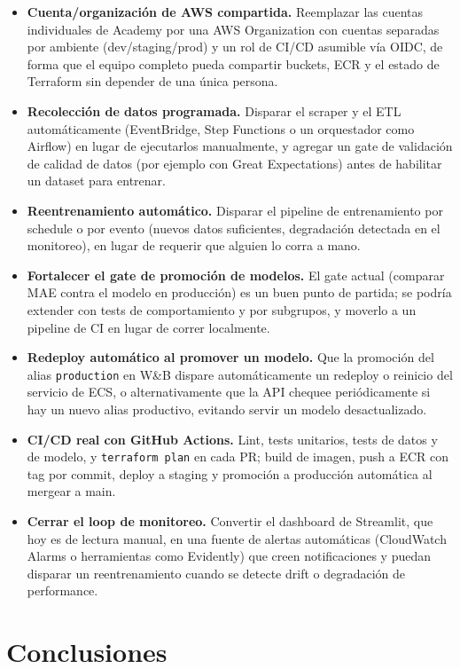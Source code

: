 \documentclass[letterpaper,12pt]{article}
\begin{document}
\begin{itemize}
    \item \textbf{Cuenta/organización de AWS compartida.} Reemplazar las cuentas individuales de Academy por una AWS Organization con cuentas separadas por ambiente (dev/staging/prod) y un rol de CI/CD asumible vía OIDC, de forma que el equipo completo pueda compartir buckets, ECR y el estado de Terraform sin depender de una única persona.
    \item \textbf{Recolección de datos programada.} Disparar el scraper y el ETL automáticamente (EventBridge, Step Functions o un orquestador como Airflow) en lugar de ejecutarlos manualmente, y agregar un gate de validación de calidad de datos (por ejemplo con Great Expectations) antes de habilitar un dataset para entrenar.
    \item \textbf{Reentrenamiento automático.} Disparar el pipeline de entrenamiento por schedule o por evento (nuevos datos suficientes, degradación detectada en el monitoreo), en lugar de requerir que alguien lo corra a mano.
    \item \textbf{Fortalecer el gate de promoción de modelos.} El gate actual (comparar MAE contra el modelo en producción) es un buen punto de partida; se podría extender con tests de comportamiento y por subgrupos, y moverlo a un pipeline de CI en lugar de correr localmente.
    \item \textbf{Redeploy automático al promover un modelo.} Que la promoción del alias \texttt{production} en W\&B dispare automáticamente un redeploy o reinicio del servicio de ECS, o alternativamente que la API chequee periódicamente si hay un nuevo alias productivo, evitando servir un modelo desactualizado.
    \item \textbf{CI/CD real con GitHub Actions.} Lint, tests unitarios, tests de datos y de modelo, y \texttt{terraform plan} en cada PR; build de imagen, push a ECR con tag por commit, deploy a staging y promoción a producción automática al mergear a main.
    \item \textbf{Cerrar el loop de monitoreo.} Convertir el dashboard de Streamlit, que hoy es de lectura manual, en una fuente de alertas automáticas (CloudWatch Alarms o herramientas como Evidently) que creen notificaciones y puedan disparar un reentrenamiento cuando se detecte drift o degradación de performance.
\end{itemize}


\newpage
\section{Conclusiones}
\end{document}
